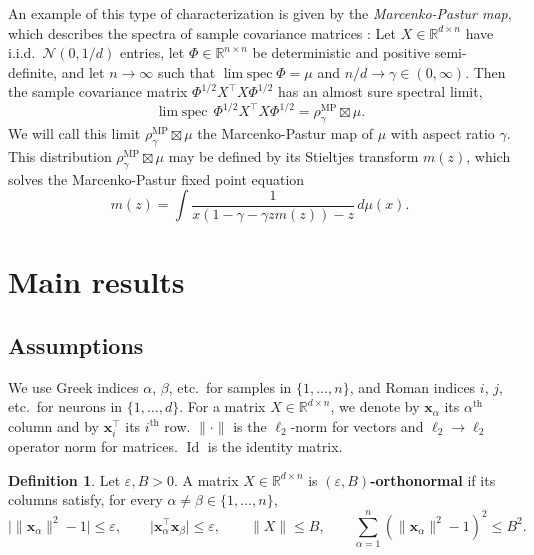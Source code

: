 \documentclass{article}
\theoremstyle{definition}
\newtheorem{definition}[theorem]{Definition}
\newcommand{\R}{\mathbb{R}}
\newcommand{\N}{\mathcal{N}}
\newcommand{\E}{\mathbb{E}}
\newcommand{\Id}{\operatorname{Id}}
\newcommand{\MP}{\text{MP}}
\newcommand{\x}{\mathbf{x}}
\renewcommand{\a}{\alpha}
\renewcommand{\b}{\beta}
\newcommand{\eps}{\varepsilon}
\newcommand{\1}{\mathbf{1}}
\newcommand{\limspec}{\operatorname{lim\;spec}}
\begin{document}
An example of this type of characterization is given by the
\emph{Marcenko-Pastur map}, which describes the spectra of sample covariance
matrices \cite{marchenko1967distribution}:
Let $X \in \R^{d \times n}$ have i.i.d.\ $\N(0,1/d)$ entries, let
$\Phi \in \R^{n \times n}$ be deterministic and
positive semi-definite, and let $n \to \infty$
such that $\limspec \Phi=\mu$ and $n/d \to \gamma \in (0,\infty)$. Then
the sample covariance matrix $\Phi^{1/2}X^\top X\Phi^{1/2}$
has an almost sure spectral limit,
\begin{equation}\label{eq:MPmap}
\limspec\,\Phi^{1/2}X^\top X\Phi^{1/2}=\rho^\MP_\gamma \boxtimes \mu.
\end{equation}
We will call this limit $\rho^\MP_\gamma \boxtimes \mu$
the Marcenko-Pastur map of $\mu$ with aspect ratio $\gamma$.
This distribution $\rho^\MP_\gamma \boxtimes \mu$ may be defined by its
Stieltjes transform $m(z)$, which solves the Marcenko-Pastur fixed point
equation \cite{marchenko1967distribution}
\begin{equation}\label{eq:MPeq}
m(z)=\int \frac{1}{x(1-\gamma-\gamma zm(z))-z}\,d\mu(x).
\end{equation}

\section{Main results}\label{sec:results}

\subsection{Assumptions}

We use Greek indices $\a$, $\b$, etc.\ for samples in $\{1,\ldots,n\}$, and
Roman indices $i$, $j$, etc.\ for neurons in $\{1,\ldots,d\}$.
For a matrix $X \in \R^{d \times n}$,
we denote by $\x_\a$ its $\a^\text{th}$ column and by
$\x_i^\top$ its $i^\text{th}$ row. $\|\cdot\|$ is the $\ell_2$-norm for
vectors and $\ell_2 \to \ell_2$ operator norm for matrices. $\Id$ is the
identity matrix.

\begin{definition}\label{def:orthogonal}
Let $\eps,B>0$. A matrix $X \in \R^{d \times n}$ is
{\bf $(\eps,B)$-orthonormal} if its columns satisfy,
for every $\a \neq \b \in \{1,\ldots,n\}$,
\[\big|\|\x_\a\|^2-1\big| \leq \eps,
\qquad \big|\x_\a^\top \x_\b \big| \leq \eps,
\qquad \|X\| \leq B, \qquad
\sum_{\a=1}^n (\|\x_\a\|^2-1)^2 \leq B^2.\]
\end{definition}
\end{document}
